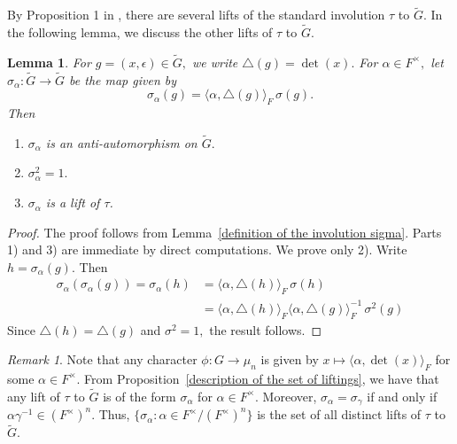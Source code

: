 \documentclass[11pt, a4paper, reqno]{amsart}
\newtheorem{lemma}[theorem]{Lemma}
\theoremstyle{definition}
\theoremstyle{remark}
\newtheorem{remark}[theorem]{Remark}
\theoremstyle{example}
\theoremstyle{note}
\numberwithin{equation}{section}
\begin{document}
By Proposition 1 in \cite{Kab}, there are several lifts of the standard involution $\tau$ to $\widetilde{G}$. In the following lemma, we discuss the other lifts of $\tau$ to $\widetilde{G}$.






\begin{lemma}\label{other lifts of tau}  For $g = (x, \epsilon) \in \widetilde{G},$ we write $\triangle(g) = \det(x).$ For  $\alpha \in F^{\times},$ let $\sigma_{\alpha}:  \widetilde{G} \to \widetilde{G}$ be the map given by
\begin{equation*}\label{definiton of sigma-alpha}
\sigma_{\alpha}(g)= \langle \alpha, \triangle(g)\rangle_{F} \,\sigma(g).\end{equation*} 
Then 
\begin{enumerate}[label=\emph{\arabic*)}]
\item $\sigma_{\alpha}$ is an anti-automorphism on $\widetilde{G}.$
\vspace{0.1 cm}
\item $\sigma_{\alpha}^2 =1.$ 
\vspace{0.1 cm}
\item $\sigma_{\alpha}$ is a lift of $\tau$. 
\end{enumerate}
\end{lemma}

\begin{proof} The proof follows from Lemma~\ref{definition of the involution sigma}. Parts 1) and 3) are immediate by direct computations. We prove only 2).
Write $h = \sigma_{\alpha}(g).$ Then
\begin{align*}
\sigma_{\alpha}(\sigma_{\alpha}(g))=\sigma_{\alpha}(h) & = \langle \alpha, \triangle(h)\rangle_{F} \,  \sigma(h) \\
    & = \langle \alpha, \triangle(h)\rangle_{F} \langle \alpha, \triangle(g)\rangle_{F}^{-1}\, \sigma^{2}(g)
\end{align*}
Since $\triangle(h) =  \triangle(g)$ and $\sigma^{2} =1,$ the result follows.  \end{proof}



\begin{remark} Note that any character $\phi:G \to \mu_n$ is given by $x \mapsto \langle \alpha, \det(x) \rangle_F$ for some $\alpha\in F^{\times}$. From Proposition~\ref{description of the set of liftings}, we have that any lift of $\tau$ to $\widetilde{G}$ is of the form $\sigma_{\alpha}$ for $\alpha\in F^{\times}$. Moreover, $\sigma_{\alpha} = \sigma_{\gamma}$ if and only if $\alpha \gamma^{-1} \in (F^{\times})^n$. Thus, $\{ \sigma_{\alpha}: \alpha \in F^{\times}/(F^{\times})^n \}$ is the set of all distinct lifts of $\tau$ to $\widetilde{G}.$ 
\end{remark}
\end{document}
